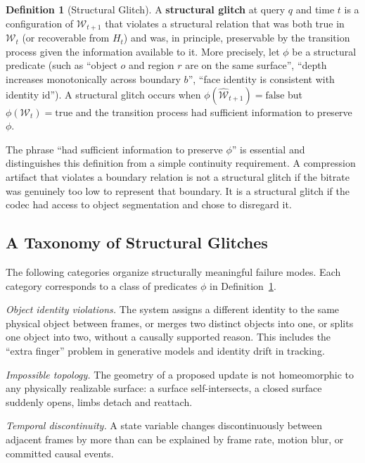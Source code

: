 \documentclass[11pt,a4paper]{article}
\theoremstyle{plain}
\theoremstyle{definition}
\newtheorem{definition}[theorem]{Definition}
\theoremstyle{remark}
\begin{document}
\begin{definition}[Structural Glitch]
\label{def:glitch}
A \textbf{structural glitch} at query $q$ and time $t$ is a configuration of $\hat{\mathcal{W}}_{t+1}$ that violates a structural relation that was both true in $\mathcal{W}_t$ (or recoverable from $H_t$) and was, in principle, preservable by the transition process given the information available to it. More precisely, let $\phi$ be a structural predicate (such as ``object $o$ and region $r$ are on the same surface'', ``depth increases monotonically across boundary $b$'', ``face identity is consistent with identity $\text{id}$''). A structural glitch occurs when $\phi(\hat{\mathcal{W}}_{t+1}) = \text{false}$ but $\phi(\mathcal{W}_t) = \text{true}$ and the transition process had sufficient information to preserve $\phi$.
\end{definition}

The phrase ``had sufficient information to preserve $\phi$'' is essential and distinguishes this definition from a simple continuity requirement. A compression artifact that violates a boundary relation is not a structural glitch if the bitrate was genuinely too low to represent that boundary. It is a structural glitch if the codec had access to object segmentation and chose to disregard it.

\subsection{A Taxonomy of Structural Glitches}

The following categories organize structurally meaningful failure modes. Each category corresponds to a class of predicates $\phi$ in Definition~\ref{def:glitch}.

\textit{Object identity violations.} The system assigns a different identity to the same physical object between frames, or merges two distinct objects into one, or splits one object into two, without a causally supported reason. This includes the ``extra finger'' problem in generative models and identity drift in tracking.

\textit{Impossible topology.} The geometry of a proposed update is not homeomorphic to any physically realizable surface: a surface self-intersects, a closed surface suddenly opens, limbs detach and reattach.

\textit{Temporal discontinuity.} A state variable changes discontinuously between adjacent frames by more than can be explained by frame rate, motion blur, or committed causal events.
\end{document}
